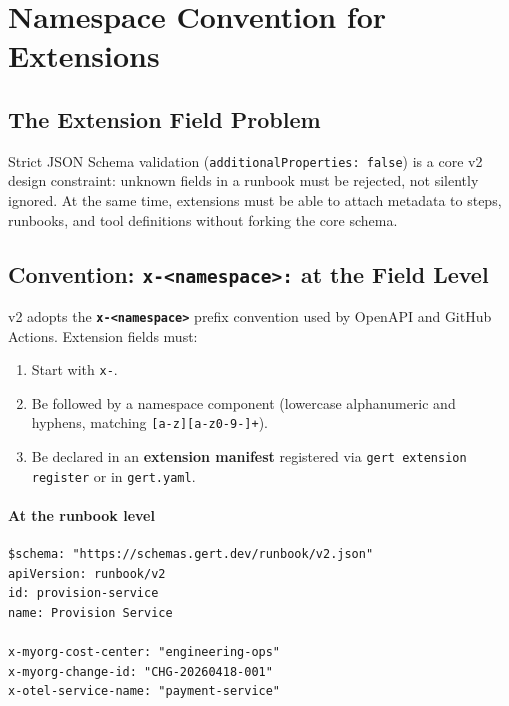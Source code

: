 \section{Namespace Convention for Extensions}
\label{sec:namespaces}

\subsection{The Extension Field Problem}

Strict JSON Schema validation (\texttt{additionalProperties: false}) is a core
v2 design constraint: unknown fields in a runbook must be rejected, not silently
ignored.  At the same time, extensions must be able to attach metadata to steps,
runbooks, and tool definitions without forking the core schema.

\subsection{Convention: \texttt{x-<namespace>:} at the Field Level}

v2 adopts the \textbf{\texttt{x-<namespace>}} prefix convention used by OpenAPI
and GitHub Actions.  Extension fields must:

\begin{enumerate}
  \item Start with \texttt{x-}.
  \item Be followed by a namespace component (lowercase alphanumeric and hyphens,
        matching \texttt{[a-z][a-z0-9-]+}).
  \item Be declared in an \textbf{extension manifest} registered via
        \texttt{gert extension register} or in \texttt{gert.yaml}.
\end{enumerate}

\paragraph{At the runbook level}

\begin{verbatim}
$schema: "https://schemas.gert.dev/runbook/v2.json"
apiVersion: runbook/v2
id: provision-service
name: Provision Service

x-myorg-cost-center: "engineering-ops"
x-myorg-change-id: "CHG-20260418-001"
x-otel-service-name: "payment-service"
\end{verbatim}

